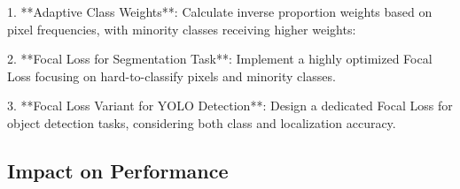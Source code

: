 \documentclass[conference]{IEEEtran}
\begin{document}
        


    
    

1. **Adaptive Class Weights**: Calculate inverse proportion weights based on pixel frequencies, with minority classes receiving higher weights:

2. **Focal Loss for Segmentation Task**: Implement a highly optimized Focal Loss focusing on hard-to-classify pixels and minority classes.

3. **Focal Loss Variant for YOLO Detection**: Design a dedicated Focal Loss for object detection tasks, considering both class and localization accuracy.


\subsection{Impact on Performance}




\end{document}
